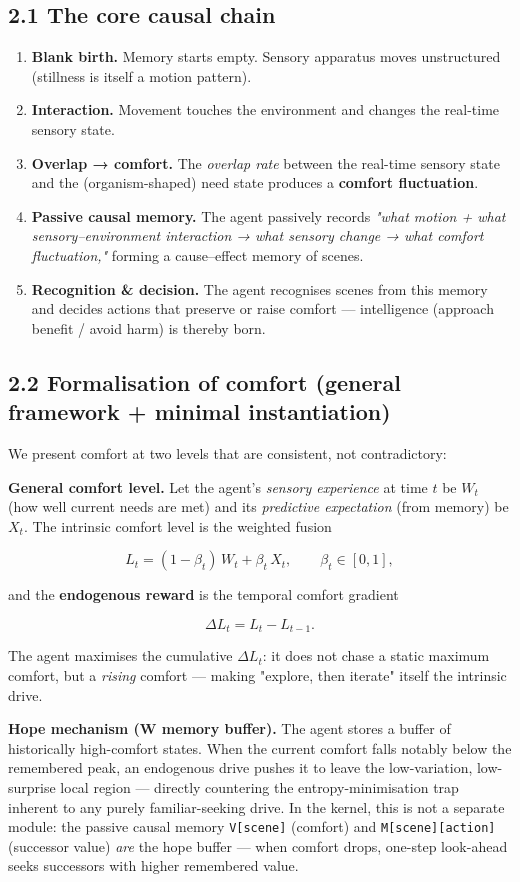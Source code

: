 \documentclass[11pt]{article}
\begin{document}
\subsection{2.1 The core causal chain}
\begin{enumerate}
\item \textbf{Blank birth.} Memory starts empty. Sensory apparatus moves unstructured (stillness is itself a motion pattern).
\item \textbf{Interaction.} Movement touches the environment and changes the real-time sensory state.
\item \textbf{Overlap → comfort.} The \emph{overlap rate} between the real-time sensory state and the (organism-shaped) need state produces a \textbf{comfort fluctuation}.
\item \textbf{Passive causal memory.} The agent passively records \emph{"what motion + what sensory–environment interaction → what sensory change → what comfort fluctuation,"} forming a cause–effect memory of scenes.
\item \textbf{Recognition \& decision.} The agent recognises scenes from this memory and decides actions that preserve or raise comfort — intelligence (approach benefit / avoid harm) is thereby born.
\end{enumerate}

\subsection{2.2 Formalisation of comfort (general framework + minimal instantiation)}
We present comfort at two levels that are consistent, not contradictory:

\textbf{General comfort level.} Let the agent's \emph{sensory experience} at time $t$ be $W_t$ (how well current needs are met) and its \emph{predictive expectation} (from memory) be $X_t$. The intrinsic comfort level is the weighted fusion

\[
L_t = (1-\beta_t)\,W_t + \beta_t\,X_t,\qquad \beta_t\in[0,1],
\]

and the \textbf{endogenous reward} is the temporal comfort gradient

\[
\Delta L_t = L_t - L_{t-1}.
\]

The agent maximises the cumulative $\Delta L_t$: it does not chase a static maximum comfort, but a \emph{rising} comfort — making "explore, then iterate" itself the intrinsic drive.

\textbf{Hope mechanism (W memory buffer).} The agent stores a buffer of historically high-comfort states. When the current comfort falls notably below the remembered peak, an endogenous drive pushes it to leave the low-variation, low-surprise local region — directly countering the entropy-minimisation trap inherent to any purely familiar-seeking drive. In the kernel, this is not a separate module: the passive causal memory \texttt{V[scene]} (comfort) and \texttt{M[scene][action]} (successor value) \emph{are} the hope buffer — when comfort drops, one-step look-ahead seeks successors with higher remembered value.
\end{document}
